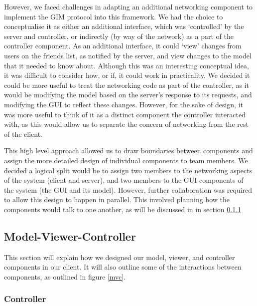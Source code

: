 However, we faced challenges in adapting an additional networking component to implement the GIM protocol into this framework. We had the choice to conceptualise it as either an additional interface, which was `controlled' by the server and controller, or indirectly (by way of the network) as a part of the controller component. As an additional interface, it could `view' changes from users on the friends list, as notified by the server, and view changes to the model that it needed to know about. Although this was an interesting conceptual idea, it was difficult to consider how, or if, it could work in practicality. We decided it could be more useful to treat the networking code as part of the controller, as it would be modifying the model based on the server's response to its requests, and modifying the GUI to reflect these changes. However, for the sake of design, it was more useful to think of it as a distinct component the controller interacted with, as this would allow us to separate the concern of networking from the rest of the client.
	
This high level approach allowed us to draw boundaries between components and assign the more detailed design of individual components to team members. We decided a logical split would be to assign two members to the networking aspects of the system (client and server), and two members to the GUI components of the system (the GUI and its model). However, further collaboration was required to allow this design to happen in parallel. This involved planning how the components would talk to one another, as will be discussed in in section \ref{controller}

\subsection {Model-Viewer-Controller}

This section will explain how we designed our model, viewer, and controller components in our client. It will also outline some of the interactions between components, as outlined in figure \ref{mvc}. 

\subsubsection {Controller}
\label{controller}


